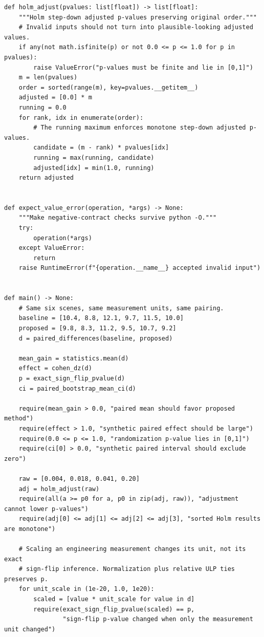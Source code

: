 \begin{verbatim}
def holm_adjust(pvalues: list[float]) -> list[float]:
    """Holm step-down adjusted p-values preserving original order."""
    # Invalid inputs should not turn into plausible-looking adjusted values.
    if any(not math.isfinite(p) or not 0.0 <= p <= 1.0 for p in pvalues):
        raise ValueError("p-values must be finite and lie in [0,1]")
    m = len(pvalues)
    order = sorted(range(m), key=pvalues.__getitem__)
    adjusted = [0.0] * m
    running = 0.0
    for rank, idx in enumerate(order):
        # The running maximum enforces monotone step-down adjusted p-values.
        candidate = (m - rank) * pvalues[idx]
        running = max(running, candidate)
        adjusted[idx] = min(1.0, running)
    return adjusted


def expect_value_error(operation, *args) -> None:
    """Make negative-contract checks survive python -O."""
    try:
        operation(*args)
    except ValueError:
        return
    raise RuntimeError(f"{operation.__name__} accepted invalid input")


def main() -> None:
    # Same six scenes, same measurement units, same pairing.
    baseline = [10.4, 8.8, 12.1, 9.7, 11.5, 10.0]
    proposed = [9.8, 8.3, 11.2, 9.5, 10.7, 9.2]
    d = paired_differences(baseline, proposed)

    mean_gain = statistics.mean(d)
    effect = cohen_dz(d)
    p = exact_sign_flip_pvalue(d)
    ci = paired_bootstrap_mean_ci(d)

    require(mean_gain > 0.0, "paired mean should favor proposed method")
    require(effect > 1.0, "synthetic paired effect should be large")
    require(0.0 <= p <= 1.0, "randomization p-value lies in [0,1]")
    require(ci[0] > 0.0, "synthetic paired interval should exclude zero")

    raw = [0.004, 0.018, 0.041, 0.20]
    adj = holm_adjust(raw)
    require(all(a >= p0 for a, p0 in zip(adj, raw)), "adjustment cannot lower p-values")
    require(adj[0] <= adj[1] <= adj[2] <= adj[3], "sorted Holm results are monotone")

    # Scaling an engineering measurement changes its unit, not its exact
    # sign-flip inference. Normalization plus relative ULP ties preserves p.
    for unit_scale in (1e-20, 1.0, 1e20):
        scaled = [value * unit_scale for value in d]
        require(exact_sign_flip_pvalue(scaled) == p,
                "sign-flip p-value changed when only the measurement unit changed")


\end{verbatim}
